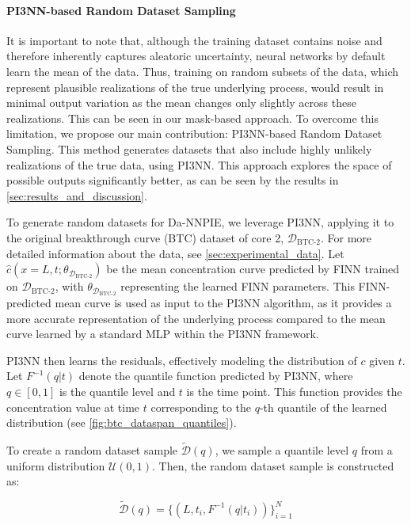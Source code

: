 \paragraph{PI3NN-based Random Dataset Sampling}
\label{sec:random_dataset_sampling}
It is important to note that, although the training dataset contains noise and therefore inherently captures aleatoric uncertainty, neural networks by default learn the mean of the data. Thus, training on random subsets of the data, which represent plausible realizations of the true underlying process, would result in minimal output variation as the mean changes only slightly across these realizations. This can be seen in our mask-based approach. To overcome this limitation, we propose our main contribution: PI3NN-based Random Dataset Sampling. This method generates datasets that also include highly unlikely realizations of the true data, using PI3NN. This approach explores the space of possible outputs significantly better, as can be seen by the results in \cref{sec:results_and_discussion}.

To generate random datasets for Da-NNPIE, we leverage PI3NN, applying it to the original breakthrough curve (BTC) dataset of core 2, $\mathcal{D}_{\text{BTC-2}}$. For more detailed information about the data, see \cref{sec:experimental_data}.
Let $\hat{c}(x=L,t;\theta_{\mathcal{D}_{\text{BTC-2}}})$ be the mean concentration curve predicted by FINN trained on $\mathcal{D}_{\text{BTC-2}}$, with $\theta_{\mathcal{D}_{\text{BTC-2}}}$ representing the learned FINN parameters. This FINN-predicted mean curve is used as input to the PI3NN algorithm, as it provides a more accurate representation of the underlying process compared to the mean curve learned by a standard MLP within the PI3NN framework.

PI3NN then learns the residuals, effectively modeling the distribution of $c$ given $t$. Let $F^{-1}(q | t)$ denote the quantile function predicted by PI3NN, where $q \in [0, 1]$ is the quantile level and $t$ is the time point. This function provides the concentration value at time $t$ corresponding to the $q$-th quantile of the learned distribution (see \cref{fig:btc_dataspan_quantiles}).

To create a random dataset sample $\tilde{\mathcal{D}}(q)$, we sample a quantile level $q$ from a uniform distribution $\mathcal{U}(0, 1)$. Then, the random dataset sample is constructed as:

$$
\tilde{\mathcal{D}}(q) = \{ (L, t_i, F^{-1}(q | t_i) ) \}_{i=1}^N
$$

